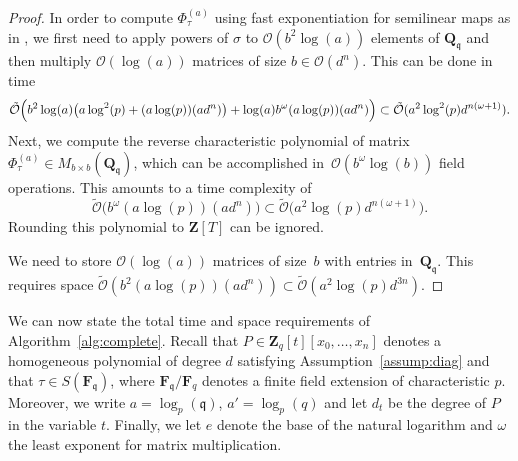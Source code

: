 \documentclass[a4paper,11pt]{article}
\numberwithin{equation}{section}
\newcommand{\ZZ}{\mathbf{Z}} %
\newcommand{\QQ}{\mathbf{Q}} %
\newcommand{\FF}{\mathbf{F}} %
\providecommand{\BigOh}{\mathcal{O}}          %
\providecommand{\SoftOh}{\tilde{\mathcal{O}}} %
\theoremstyle{definition}
\begin{document}
\begin{proof}
In order to compute $\Phi_{\tau}^{(a)}$ using fast exponentiation for 
semilinear maps as in \citep[Lemma 32]{LauderWan2008}, we first need to apply powers of $\sigma$ to $\BigOh(b^2 \log(a))$ 
elements of $\QQ_{\mathfrak{q}}$ and then multiply $\BigOh(\log (a))$ matrices 
of size $b \in \BigOh(d^n)$. This can be done in time 
\begin{gather*}
\SoftOh\Bigl( b^2 \log(a) \bigl( a \log^2(p) + (a \log(p))(a d^n)  \bigr) 
    + \log(a) b^{\omega} (a \log(p))(a d^n)  \Bigr) 
\subset \SoftOh(a^2 \log^2(p) d^{n(\omega+1)}).
\end{gather*}
Next, we compute the reverse characteristic polynomial of matrix 
$\Phi_{\tau}^{(a)} \in M_{b \times b}(\QQ_{\mathfrak{q}})$, which 
can be accomplished in~$\BigOh(b^{\omega} \log(b))$ field operations. 
This amounts to a time complexity of 
\begin{equation*}
\SoftOh\bigl(b^{\omega} (a \log(p))(a d^n) \bigr)
    \subset \SoftOh\bigl( a^2 \log(p) d^{n(\omega+1)} \bigr).
\end{equation*}
Rounding this polynomial to $\ZZ[T]$ can be ignored.

We need to store $\BigOh(\log(a))$ matrices of size~$b$ with entries 
in~$\QQ_{\mathfrak{q}}$.  This requires space 
$\SoftOh(b^2 (a \log(p)) (a d^n)) \subset \SoftOh(a^2 \log(p) d^{3n})$.
\end{proof}

We can now state the total time and space requirements of 
Algorithm~\ref{alg:complete}. Recall that $P \in \ZZ_q[t][x_0,\dotsc,x_n]$ 
denotes a homogeneous polynomial
of degree $d$ satisfying Assumption~\ref{assump:diag} 
and that $\tau \in S(\mathbf{F}_{\mathfrak{q}})$, where 
$\FF_{\mathfrak{q}}/\FF_q$ denotes a finite field extension
of characteristic $p$. 
Moreover, we write $a=\log_p(\mathfrak{q})$, $a'=\log_p(q)$ and let
$d_t$ be the degree of $P$ in the variable $t$. Finally,
we let $e$ denote the base of the natural
logarithm and $\omega$ the least exponent for matrix multiplication.
\end{document}
